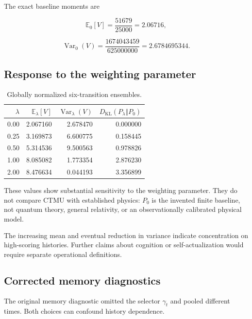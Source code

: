 \documentclass[11pt]{article}
\theoremstyle{remark}
\newcommand{\KL}{D_{\mathrm{KL}}}
\newcommand{\E}{\mathbb{E}}
\begin{document}
The exact baseline moments are

\begin{equation}
\E_0[V]
=
\frac{51679}{25000}
=
2.06716,
\end{equation}

\begin{equation}
\operatorname{Var}_0(V)
=
\frac{1674043459}{625000000}
=
2.6784695344.
\end{equation}

\subsection{Response to the weighting parameter}

\begin{table}[htbp]
\centering
\caption{Globally normalized six-transition ensembles.}
\label{tab:lambda}
\begin{tabular}{@{}rrrr@{}}
\toprule
\(\lambda\) & \(\E_\lambda[V]\) & \(\operatorname{Var}_\lambda(V)\) & \(\KL(P_\lambda\Vert P_0)\) \\
\midrule
0.00 & 2.067160 & 2.678470 & 0.000000 \\
0.25 & 3.169873 & 6.600775 & 0.158445 \\
0.50 & 5.314536 & 9.500563 & 0.978826 \\
1.00 & 8.085082 & 1.773354 & 2.876230 \\
2.00 & 8.476634 & 0.044193 & 3.356899 \\
\bottomrule
\end{tabular}
\end{table}

These values show substantial sensitivity to the weighting parameter. They do not compare CTMU with established physics: \(P_0\) is the invented finite baseline, not quantum theory, general relativity, or an observationally calibrated physical model.

The increasing mean and eventual reduction in variance indicate concentration on high-scoring histories. Further claims about cognition or self-actualization would require separate operational definitions.

\subsection{Corrected memory diagnostics}

The original memory diagnostic omitted the selector \(\gamma_t\) and pooled different times. Both choices can confound history dependence.
\end{document}
